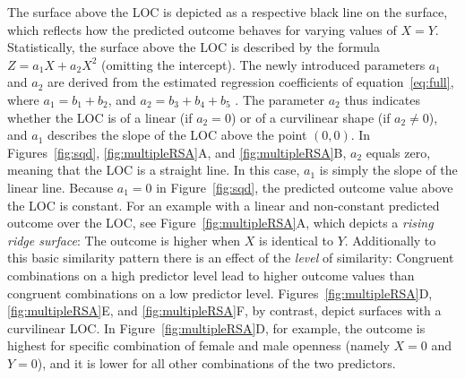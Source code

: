 \documentclass[jou,a4paper,draftfirst]{apa6}
\begin{document}
The surface above the LOC is depicted as a respective black line on the surface, which reflects how the predicted outcome behaves for varying values of $X = Y$. Statistically, the surface above the LOC is described by the formula $Z = a_1X + a_2X^2$ (omitting the intercept). The newly introduced parameters $a_1$ and $a_2$ are derived from the estimated regression coefficients of equation~\eqref{eq:full}, where $a_1 = b_1 + b_2$, and $a_2 = b_3 + b_4 + b_5$ \parencite{shanock_polynomial_2010}. The parameter $a_2$ thus indicates whether the LOC is of a linear (if $a_2 = 0$) or of a curvilinear shape (if $a_2 \neq 0$), and $a_1$ describes the slope of the LOC above the point $(0,0)$. In Figures~\ref{fig:sqd}, \ref{fig:multipleRSA}A, and \ref{fig:multipleRSA}B, $a_2$ equals zero, meaning that the LOC is a straight line. In this case, $a_1$ is simply the slope of the linear line. Because $a_1 = 0$ in Figure~\ref{fig:sqd}, the predicted outcome value above the LOC is constant. For an example with a linear and non-constant predicted outcome over the LOC, see Figure~\ref{fig:multipleRSA}A, which depicts a \textit{rising ridge surface}: The outcome is higher when $X$ is identical to $Y$. Additionally to this basic similarity pattern there is an effect of the \textit{level} of similarity: Congruent combinations on a high predictor level lead to higher outcome values than congruent combinations on a low predictor level. Figures~\ref{fig:multipleRSA}D, \ref{fig:multipleRSA}E, and \ref{fig:multipleRSA}F, by contrast, depict surfaces with a curvilinear LOC. In Figure~\ref{fig:multipleRSA}D, for example, the outcome is highest for specific combination of female and male openness (namely $X = 0$ and $Y = 0$), and it is lower for all other combinations of the two predictors.
\end{document}
